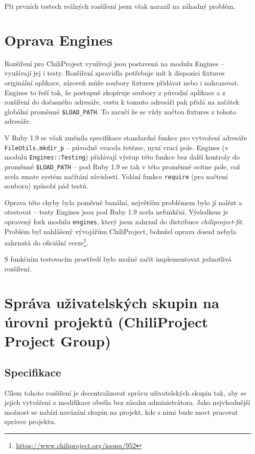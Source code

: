 \documentclass[thesis=B,czech]{FITthesis}[2012/05/02]
\begin{document}
Při prvních testech reálných rozšíření jsem však narazil na záhadný
problém.

\section{Oprava Engines}
\label{sec:oprava-engines}

Rozšíření pro ChiliProject využívají jsou postavená na modulu Engines --
využívají jej i testy. Rozšíření zpravidla potřebuje mít k dispozici
\gls{fixtures} originální aplikace, zároveň může soubory fixtures
přidávat nebo i nahrazovat. Engines to řeší tak, že postupně zkopíruje
soubory z původní aplikace a z rozšíření do dočasného adresáře, cestu
k tomuto adresáři pak přidá na začátek globální proměnné
\lstinline!$LOAD_PATH!. To zaručí že se vždy načtou fixtures z tohoto
adresáře.

V Ruby 1.9 se však změnila specifikace standardní funkce pro vytvoření
adresáře \lstinline!FileUtils.mkdir_p! -- původně vracela řetězec, nyní
vrací pole. Engines (v modulu \lstinline!Engines::Testing!) přidávají
výstup této funkce bez další kontroly do proměnné \lstinline!$LOAD_PATH!
-- pod Ruby 1.9 se tak v této proměnné ocitne pole, což zcela zmate
systém načítání závislostí. Volání funkce \lstinline!require! (pro
načtení souboru) způsobí pád testů.

Oprava této chyby byla poměrně banální, největším problémem bylo jí
nalézt a otestovat -- testy Engines jsou pod Ruby 1.9 zcela nefunkční.
Výsledkem je opravený \gls{fork} modulu \lstinline!engines!, který jsem
zahrnul do distribuce \emph{chiliproject-fit}. Problém byl
nahlášený vývojářům ChiliProject, bohužel oprava dosud nebyla zahrnutá
do oficiální verze\footnote{\url{https://www.chiliproject.org/issues/952}}.

S funkčním testovacím prostředí bylo možné začít implementovat
jednotlivá rozšíření.

\section[Správa uživatelských skupin na úrovni projektů]{Správa uživatelských skupin na úrovni projektů (ChiliProject
Project Group)}
\label{sec:project_group}

\subsection{Specifikace}

Cílem tohoto rozšíření je decentralizovat správu uživatelských skupin
tak, aby se jejich vytváření a modifikace obešla bez zásahu
administrátora. Jako nejvhodnější možnost se nabízí navázání skupin na
projekt, kde s nimi bude moct pracovat správce projektu.
\end{document}
